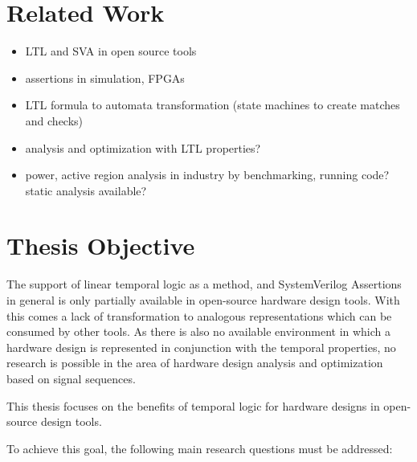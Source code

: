 \documentclass[11pt,DIV=16,parskip=half]{scrartcl}
\begin{document}
\section{Related Work}



\begin{itemize}
  \item LTL and SVA in open source tools
  \item assertions in simulation, FPGAs
  \item LTL formula to automata transformation (state machines to create matches and checks)
  \item analysis and optimization with LTL properties?
  \item power, active region analysis in industry by benchmarking, running code? static analysis available?
\end{itemize}

\section{Thesis Objective}


The support of linear temporal logic as a method, and SystemVerilog Assertions
in general is only partially available in open-source hardware design tools.
With this comes a lack of transformation to analogous representations which can
be consumed by other tools.
As there is also no available environment in which a hardware design is
represented in conjunction with the temporal properties, no research is
possible in the area of hardware design analysis and optimization based on
signal sequences.

This thesis focuses on the benefits of temporal logic for hardware designs in
open-source design tools.

To achieve this goal, the following main research questions must be addressed:
\end{document}
